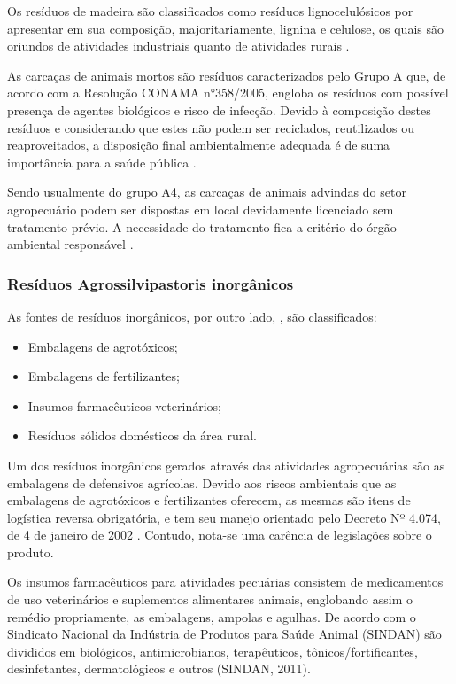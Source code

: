 	Os resíduos de madeira são classificados como resíduos lignocelulósicos por apresentar em sua composição, majoritariamente, lignina e celulose, os quais são oriundos de atividades industriais quanto de atividades rurais \cite{TEIXEIRA2005}.
	
	As carcaças de animais mortos são resíduos caracterizados pelo Grupo A que, de acordo com a Resolução CONAMA n°358/2005, engloba os resíduos com possível presença de agentes biológicos e risco de infecção. Devido à composição destes resíduos e considerando que estes não podem ser reciclados, reutilizados ou reaproveitados, a disposição final ambientalmente adequada é de suma importância para a saúde pública \cite{conama:358}.
	
	Sendo usualmente do grupo A4, as carcaças de animais advindas do setor agropecuário podem ser dispostas em local devidamente licenciado sem tratamento prévio. A necessidade do tratamento fica a critério do órgão ambiental responsável \cite{conama:358}.
	
	\subsubsection{Resíduos Agrossilvipastoris inorgânicos}
	
	As fontes de resíduos inorgânicos, por outro lado, \cite{MMA2012}, são classificados:
	
	\begin{itemize}
		\item 	Embalagens de agrotóxicos;
		\item   Embalagens de fertilizantes;
		\item 	Insumos farmacêuticos veterinários;
		\item   Resíduos sólidos domésticos da área rural.
	\end{itemize}

	Um dos resíduos inorgânicos gerados através das atividades agropecuárias são as embalagens de defensivos agrícolas. Devido aos riscos ambientais que as embalagens de agrotóxicos e fertilizantes oferecem, as mesmas são itens de logística reversa obrigatória, e tem seu manejo orientado pelo Decreto Nº 4.074, de 4 de janeiro de 2002 \cite{Brasil4074}. Contudo, nota-se uma carência de legislações sobre o produto.
	
	Os insumos farmacêuticos para atividades pecuárias consistem de medicamentos de uso veterinários e suplementos alimentares animais, englobando assim o remédio propriamente, as embalagens, ampolas e agulhas. De acordo com o Sindicato Nacional da Indústria de Produtos para Saúde Animal (SINDAN) são divididos em biológicos, antimicrobianos, terapêuticos, tônicos/fortificantes, desinfetantes, dermatológicos e outros (SINDAN, 2011).
	
